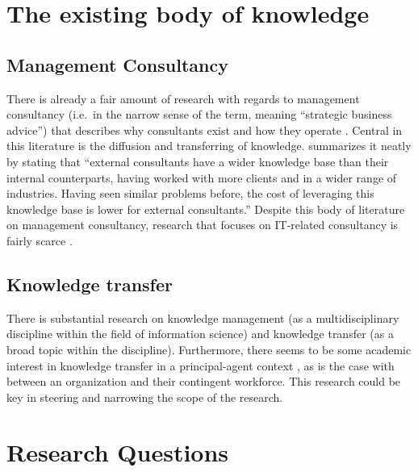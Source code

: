 \documentclass[12pt]{article}
\begin{document}
\hypertarget{the-existing-body-of-knowledge}{%
\section{The existing body of
knowledge}\label{the-existing-body-of-knowledge}}

\hypertarget{management-consultancy}{%
\subsection{Management Consultancy}\label{management-consultancy}}

There is already a fair amount of research with regards to management
consultancy (i.e.~in the narrow sense of the term, meaning ``strategic
business advice'') that describes why consultants exist
\citep{canback1998, sturdy2009} and how they operate
\citep{clark1998, bessant1995, whittle2006}. Central in this literature
is the diffusion and transferring of knowledge. \citet{canback1999}
summarizes it neatly by stating that ``external consultants have a wider
knowledge base than their internal counterparts, having worked with more
clients and in a wider range of industries. Having seen similar problems
before, the cost of leveraging this knowledge base is lower for external
consultants.'' Despite this body of literature on management
consultancy, research that focuses on IT-related consultancy is fairly
scarce \citep{bloomfield1995, nevo2007, swanson2010}.

\hypertarget{knowledge-transfer}{%
\subsection{Knowledge transfer}\label{knowledge-transfer}}

There is substantial research on knowledge management (as a
multidisciplinary discipline within the field of information science)
and knowledge transfer (as a broad topic within the discipline).
Furthermore, there seems to be some academic interest in knowledge
transfer in a principal-agent context \citep{ning2008, haines2003}, as
is the case with between an organization and their contingent workforce.
This research could be key in steering and narrowing the scope of the
research.

\hypertarget{research-questions}{%
\section{Research Questions}\label{research-questions}}
\end{document}
